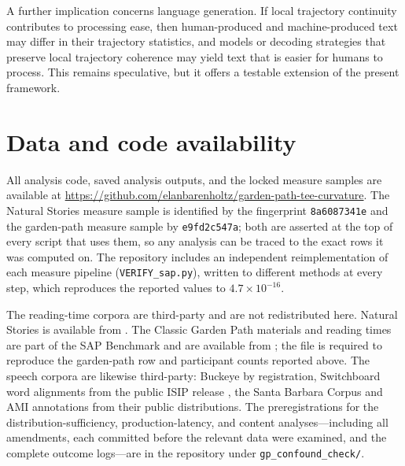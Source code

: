 \documentclass[12pt]{article}
\newcommand{\new}[1]{#1}   %
\begin{document}
A further implication concerns language generation. If local trajectory continuity contributes to processing ease, then human-produced and machine-produced text may differ in their trajectory statistics, and models or decoding strategies that preserve local trajectory coherence may yield text that is easier for humans to process. This remains speculative, but it offers a testable extension of the present framework.

\new{\section*{Data and code availability}

All analysis code, saved analysis outputs, and the locked measure samples are
available at \url{https://github.com/elanbarenholtz/garden-path-tee-curvature}.
The Natural Stories measure sample is identified by the fingerprint
\texttt{8a6087341e} and the garden-path measure sample by \texttt{e9fd2c547a};
both are asserted at the top of every script that uses them, so any analysis can
be traced to the exact rows it was computed on. The repository includes an
independent reimplementation of each measure pipeline
(\texttt{VERIFY\_sap.py}), written to different methods at every step, which
reproduces the reported values to $4.7 \times 10^{-16}$.

The reading-time corpora are third-party and are not redistributed here.
Natural Stories is available from \citet{futrell2018}. The Classic Garden Path
materials and reading times are part of the SAP Benchmark and are available from
\citet{huang2024}; the file is required to reproduce the garden-path row and
participant counts reported above. \new{The speech corpora are likewise
third-party: Buckeye \citep{pitt2007} by registration, Switchboard word
alignments from the public ISIP release \citep{godfrey1992}, the Santa Barbara
Corpus \citep{dubois2000} and AMI annotations \citep{carletta2007} from their
public distributions. The preregistrations for the distribution-sufficiency,
production-latency, and content analyses---including all amendments, each
committed before the relevant data were examined, and the complete outcome
logs---are in the repository under \texttt{gp\_confound\_check/}.}}



\end{document}

